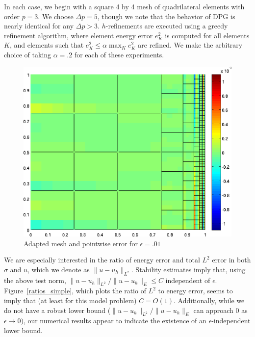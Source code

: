 \documentclass[11pt,onecolumn]{scrartcl}
\begin{document}
In each case, we begin with a square 4 by 4 mesh of quadrilateral elements with order $p=3$.  We choose $\Delta p = 5$, though we note that the behavior of DPG is nearly identical for any $\Delta p > 3$.  $h$-refinements are executed using a greedy refinement algorithm, where element energy error $e_K^2$ is computed for all elements $K$, and elements such that $e_K^2 \leq \alpha \max_K e_K^2$ are refined.  We make the arbitrary choice of taking $\alpha = .2$ for each of these experiments.  

\begin{figure}[h!]
\centering
\includegraphics[scale=.4]{figs/u_pointdiff_wallBC.png}
\caption{Adapted mesh and pointwise error for $\epsilon=.01$}
\end{figure}
We are especially interested in the ratio of energy error and total $L^2$ error in both $\sigma$ and $u$, which we denote as $\|u-u_h\|_{L^2}$.  Stability estimates imply that, using the above test norm, $\|u-u_h\|_{L^2} / \|u-u_h\|_E \leq C$ independent of $\epsilon$.  Figure~\ref{ratios_simple}, which plots the ratio of $L^2$ to energy error, seems to imply that (at least for this model problem) $C=O(1)$.  Additionally, while we do not have a robust lower bound ($\|u-u_h\|_{L^2} / \|u-u_h\|_E$ can approach $0$ as $\epsilon \rightarrow 0$), our numerical results appear to indicate the existence of an $\epsilon$-independent lower bound. 
\end{document}

